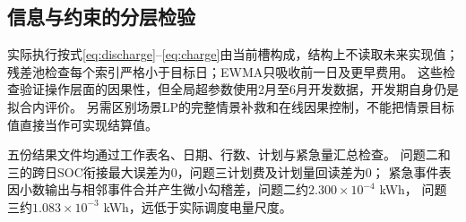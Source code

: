 \subsection{信息与约束的分层检验}
实际执行按式\eqref{eq:discharge}--\eqref{eq:charge}由当前槽构成，结构上不读取未来实现值；残差池检查每个索引严格小于目标日；EWMA只吸收前一日及更早费用。
这些检查验证操作层面的因果性，但全局超参数使用2月至6月开发数据，开发期自身仍是拟合内评价。
另需区别场景LP的完整情景补救和在线因果控制，不能把情景目标值直接当作可实现结算值。

五份结果文件均通过工作表名、日期、行数、计划与紧急量汇总检查。
问题二和三的跨日SOC衔接最大误差为0，问题三计划费及计划量回读差为0；
紧急事件表因小数输出与相邻事件合并产生微小勾稽差，问题二约$2.300\times10^{-4}$ kWh，
问题三约$1.083\times10^{-3}$ kWh，远低于实际调度电量尺度。
